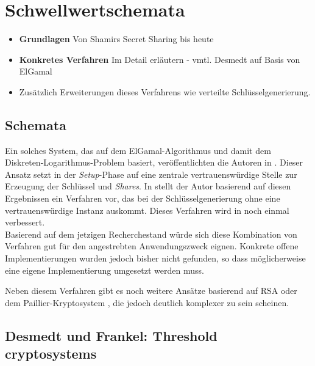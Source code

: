 \section{Schwellwertschemata}

\begin{itemize}
  \item \textbf{Grundlagen} Von Shamirs Secret Sharing bis heute
  \item \textbf{Konkretes Verfahren} Im Detail erläutern - vmtl. Desmedt auf Basis von ElGamal
  \item Zusätzlich Erweiterungen dieses Verfahrens wie verteilte Schlüsselgenerierung.
\end{itemize}


\label{sec_state_threshold}

\subsection{Schemata}

Ein solches System, das auf dem ElGamal-Algorithmus und damit dem Diskreten-Logarithmus-Problem basiert, veröffentlichten die Autoren in \cite{DesmedtFrankel1990}.  Dieser Ansatz setzt in der \textit{Setup}-Phase auf eine zentrale vertrauenswürdige Stelle zur Erzeugung der Schlüssel und \textit{Shares}. In \cite{pedersen1991} stellt der Autor basierend auf diesen Ergebnissen ein Verfahren vor, das bei der Schlüsselgenerierung ohne eine vertrauenswürdige Instanz auskommt. Dieses Verfahren wird in \cite{gennaro1999} noch einmal verbessert.\\
Basierend auf dem jetzigen Recherchestand würde sich diese Kombination von Verfahren gut für den angestrebten Anwendungszweck eignen. Konkrete offene Implementierungen wurden jedoch bisher nicht gefunden, so dass möglicherweise eine eigene Implementierung umgesetzt werden muss.

Neben diesem Verfahren gibt es noch weitere Ansätze basierend auf RSA \cite{desmedt1993, nguyen2005} oder dem Paillier-Kryptosystem \cite{paillier1999, damgard2001}, die jedoch deutlich komplexer zu sein scheinen. 

\subsection{Desmedt und Frankel: Threshold cryptosystems}

